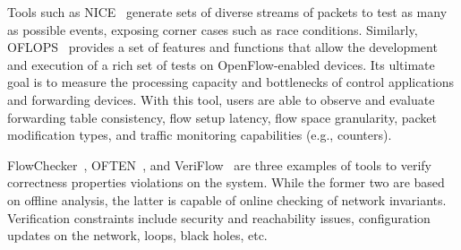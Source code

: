 

Tools such as NICE~\cite{canini2012-1} generate sets of diverse streams of packets 
to test as many as possible events, exposing corner cases such as race conditions.
Similarly, OFLOPS~\cite{rotsos2012-1} provides a set of features and functions that allow 
the development and execution of a rich set of tests on OpenFlow-enabled devices. 
Its ultimate 
goal is to measure the processing capacity and bottlenecks of control applications and forwarding devices.
With this tool, users are able to observe and evaluate forwarding table consistency, flow setup latency, 
flow space granularity, packet modification types, and traffic monitoring capabilities (e.g., counters).

FlowChecker~\cite{al-shaer2010}, OFTEN~\cite{kuzniar2012}, and VeriFlow~\cite{khurshid2012} are three examples of tools to verify correctness 
properties violations on the system. While the former two are based on offline analysis, the latter is capable of 
online checking of network invariants. Verification constraints include security and reachability issues, 
configuration updates on the network, loops, black holes, etc.

